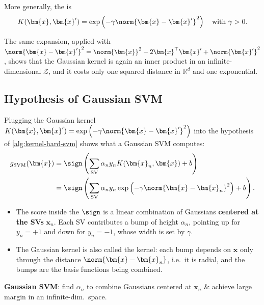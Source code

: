 \begin{definition}
    More generally, the  is
    \[
        K(\bm{x}, \bm{x}') = \exp \left( -\gamma \norm{\bm{x} - \bm{x}'}^2
        \right) \quad \text{with } \gamma > 0.
    \]
\end{definition}

The same expansion, applied with \(\norm{\bm{x} - \bm{x}'}^2 = \norm{\bm{x}}^2
- 2 \bm{x}^\top \bm{x}' + \norm{\bm{x}'}^2\), shows that the Gaussian kernel
is again an inner product in an infinite-dimensional \(\mathcal{Z}\), and it
costs only one squared distance in \(\mathbb{R}^d\) and one exponential.

\subsection{Hypothesis of Gaussian SVM}

Plugging the Gaussian kernel \(K(\bm{x}, \bm{x}') = \exp \left( -\gamma
\norm{\bm{x} - \bm{x}'}^2 \right)\) into the hypothesis of
\autoref{alg:kernel-hard-svm} shows what a Gaussian SVM computes:
\[
    \begin{aligned}
        g_{\mathrm{SVM}}(\bm{x}) &= \sign \left( \sum_{\text{SV}} \alpha_n
            y_n K(\bm{x}_n, \bm{x}) + b \right)\\
        &= \sign \left( \sum_{\text{SV}} \alpha_n y_n \exp \left( -\gamma
            \norm{\bm{x} - \bm{x}_n}^2 \right) + b \right).
    \end{aligned}
\]
\begin{itemize}
    \item The score inside the \(\sign\) is a linear combination of Gaussians
        \textbf{centered at the SVs} \(\bm{x}_n\). Each SV contributes a bump
        of height \(\alpha_n\), pointing up for \(y_n = +1\) and down for
        \(y_n = -1\), whose width is set by \(\gamma\).
    \item The Gaussian kernel is also called the  kernel: each bump depends on \(\bm{x}\) only through the
        distance \(\norm{\bm{x} - \bm{x}_n}\), i.e.\ it is radial, and the
        bumps are the basis functions being combined.
\end{itemize}

\begin{moral}
    \textbf{Gaussian SVM}: find \(\alpha_n\) to combine Gaussians centered at
    \(\bm{x}_n\) \& achieve large margin in an infinite-dim.\ space.
\end{moral}

